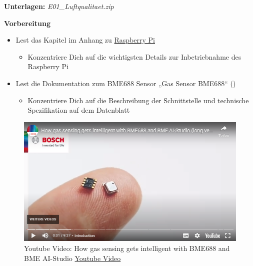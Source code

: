 \documentclass[
  11pt,
  a4paperpaper,
  oneside, openany  ,captions=tableheading
]{scrbook}
\providecommand{\tightlist}{%
  \setlength{\itemsep}{0pt}\setlength{\parskip}{0pt}}
\theoremstyle{definition}
\theoremstyle{remark}
\begin{document}
\textbf{Unterlagen:} \emph{ E01\_Luftqualitaet.zip}

\textbf{Vorbereitung}

\begin{itemize}
\tightlist
\item
  Lest das Kapitel im Anhang zu \href{A1_Rasperry_Pi.qmd}{Raspberry Pi}

  \begin{itemize}
  \tightlist
  \item
    Konzentriere Dich auf die wichtigsten Details zur Inbetriebnahme des
    Raspberry Pi
  \end{itemize}
\item
  Lest die Dokumentation zum BME688 Sensor {„Gas Sensor {BME688}``}
  ()

  \begin{itemize}
  \tightlist
  \item
    Konzentriere Dich auf die Beschreibung der Schnittstelle und
    technische Spezifikation auf dem Datenblatt
  \end{itemize}
\end{itemize}

\begin{figure}[H]

{\centering \includegraphics{images/youtube_bosch_bme688.png}

}

\caption{Youtube Video: How gas sensing gets intelligent with BME688 and
BME AI-Studio \href{https://www.youtube.com/embed/4vdliMRtxBY}{Youtube
Video}}

\end{figure}%
\end{document}
